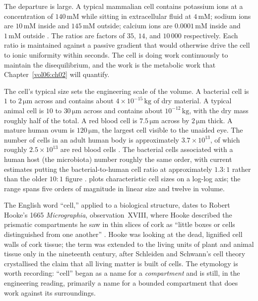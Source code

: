 The departure is large. A typical mammalian cell contains potassium
ions at a concentration of $140\,\text{mM}$ while sitting in extracellular
fluid at $4\,\text{mM}$; sodium ions are $10\,\text{mM}$ inside and
$145\,\text{mM}$ outside; calcium ions are $0.0001\,\text{mM}$ inside
and $1\,\text{mM}$ outside \cite[ch.~11]{text:v6c01-alberts-mbc-2022}.
The ratios are factors of $35$, $14$, and $10\,000$ respectively.
Each ratio is maintained against a passive gradient that would
otherwise drive the cell to ionic uniformity within seconds. The cell
is doing work continuously to maintain the disequilibrium, and the
work is the metabolic work that Chapter~\ref{vol06:ch02} will
quantify.

The cell's typical size sets the engineering scale of the volume. A
bacterial cell is $1$ to $2\,\si{\micro\meter}$ across and contains
about $4 \times 10^{-15}\,\text{kg}$ of dry material. A typical
animal cell is $10$ to $30\,\si{\micro\meter}$ across and contains
about $10^{-12}\,\text{kg}$, with the dry mass roughly half of the
total. A red blood cell is $7.5\,\si{\micro\meter}$ across by
$2\,\si{\micro\meter}$ thick. A mature human ovum is
$120\,\si{\micro\meter}$, the largest cell visible to the unaided eye.
The number of cells in an adult human body is approximately
$3.7 \times 10^{13}$, of which roughly $2.5 \times 10^{13}$ are red
blood cells \cite{paper:v6c01-bianconi-2013}. The bacterial cells
associated with a human host (the microbiota) number roughly the same
order, with current estimates putting the bacterial-to-human cell
ratio at approximately $1.3:1$ rather than the older $10:1$ figure
\cite{paper:v6c01-sender-2016}.
 plots characteristic cell sizes
on a log-log axis; the range spans five orders of magnitude in linear
size and twelve in volume.



 The English word ``cell,'' applied to a
biological structure, dates to Robert Hooke's 1665 \emph{Micrographia},
observation~XVIII, where Hooke described the prismatic compartments
he saw in thin slices of cork as ``little boxes or cells distinguished
from one another'' \cite[obs.~XVIII]{hist:v6c01-hooke-1665}. Hooke was
looking at the dead, lignified cell walls of cork tissue; the term
was extended to the living units of plant and animal tissue only in
the nineteenth century, after Schleiden and Schwann's cell theory
crystallised the claim that all living matter is built of cells. The
etymology is worth recording: ``cell'' began as a name for a
\emph{compartment} and is still, in the engineering reading, primarily
a name for a bounded compartment that does work against its
surroundings.

